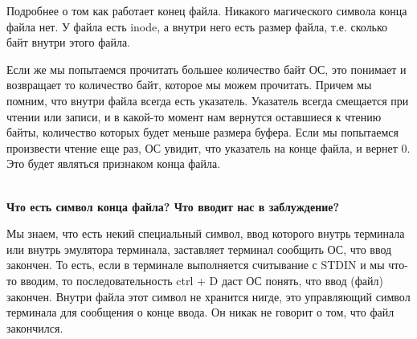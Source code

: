 Подробнее о том как работает конец файла. Никакого магического символа конца файла нет. У файла есть inode, а внутри него есть размер файла, т.е. сколько байт внутри этого файла.

Если же мы попытаемся прочитать большее количество байт ОС, это понимает и возвращает то количество байт, которое мы можем прочитать. Причем мы помним, что внутри файла всегда есть указатель. Указатель всегда смещается при чтении или записи, и в какой-то момент нам вернутся оставшиеся к чтению байты, количество которых будет меньше размера буфера. Если мы попытаемся произвести чтение еще раз, ОС увидит, что указатель на конце файла, и вернет 0. Это будет являться признаком конца файла. 

\\
\textbf{Что есть символ конца файла? Что вводит нас в заблуждение?}

Мы знаем, что есть некий специальный символ, ввод которого внутрь терминала или внутрь эмулятора терминала, заставляет терминал сообщить ОС, что ввод закончен. То есть, если в терминале выполняется считывание с STDIN и мы что-то вводим, то последовательность ctrl + D даст ОС понять, что ввод (файл) закончен. Внутри файла этот символ не хранится нигде, это управляющий символ терминала для сообщения о конце ввода. Он никак не говорит о том, что файл закончился.
